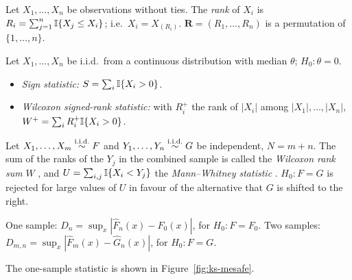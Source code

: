 \documentclass[main.tex]{subfiles}
\begin{document}
\begin{definition}[Ranks]\label{def:sira}
Let $X_1,\dots,X_n$ be observations without ties. The \emph{rank} of $X_i$ is $R_i=\sum_{j=1}^n\mathbb{I}\{X_j\le X_i\}$; i.e.\ $X_i=X_{(R_i)}$. $\mathbf R=(R_1,\dots,R_n)$ is a permutation of $\{1,\dots,n\}$.
\end{definition}

\begin{definition}\label{def:tek-orneklem-testler}
Let $X_1,\dots,X_n$ be i.i.d.\ from a continuous distribution with median $\theta$; $H_0:\theta=0$.
\begin{itemize}
  \item \emph{Sign statistic:} $S=\sum_i\mathbb{I}\{X_i>0\}$.
  \item \emph{Wilcoxon signed-rank statistic:} with $R_i^+$ the rank of $|X_i|$ among $|X_1|,\dots,|X_n|$, $W^+=\sum_iR_i^+\mathbb{I}\{X_i>0\}$.
\end{itemize}
\end{definition}

\begin{definition}\label{def:mann-whitney}
Let $X_1,\dots,X_m\overset{\text{i.i.d.}}{\sim} F$ and $Y_1,\dots,Y_n\overset{\text{i.i.d.}}{\sim} G$ be independent, $N=m+n$. The sum of the ranks of the $Y_j$ in the combined sample is called the \emph{Wilcoxon rank sum} $W$ \cite{wilcoxon45}, and $U=\sum_{i,j}\mathbb{I}\{X_i<Y_j\}$ the \emph{Mann--Whitney statistic} \cite{mann-whitney47}. $H_0:F=G$ is rejected for large values of $U$ in favour of the alternative that $G$ is shifted to the right.
\end{definition}

\begin{definition}\label{def:ks}
One sample: $D_n=\sup_x|\hat F_n(x)-F_0(x)|$, for $H_0:F=F_0$. Two samples: $D_{m,n}=\sup_x|\hat F_m(x)-\hat G_n(x)|$, for $H_0:F=G$.
\end{definition}

The one-sample statistic is shown in Figure~\ref{fig:ks-mesafe}.
\end{document}
